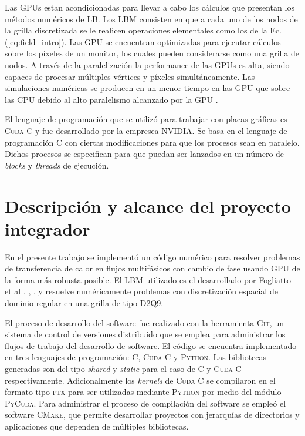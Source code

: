 Las GPUs estan acondicionadas para llevar a cabo los cálculos que presentan los métodos numéricos de LB. Los LBM consisten en que a cada uno de los nodos de la grilla discretizada se le realicen operaciones elementales como los de la Ec. (\ref{eq:field_intro}). Las GPU se encuentran optimizadas para ejecutar cálculos sobre los píxeles de un monitor, los cuales pueden considerarse como una grilla de nodos. A través de la paralelización la performance de las GPUs es alta, siendo capaces de procesar múltiples vértices y píxeles simultáneamente. Las simulaciones numéricas se producen en un menor tiempo en las GPU que sobre las CPU debido al alto paralelismo alcanzado por la GPU \cite{rinaldi2011modelos}.


El lenguaje de programación que se utilizó para trabajar con placas gráficas es \textsc{Cuda C} y fue desarrollado por la empresea NVIDIA. Se basa en el lenguaje de programación \textsc{C} con ciertas modificaciones para que los procesos sean en paralelo. Dichos procesos se especifican para que puedan ser lanzados en un número de \textit{blocks} y \textit{threads} de ejecución.

\newpage

\section{Descripción y alcance del proyecto integrador}

En el presente trabajo se implementó un código numérico para resolver problemas de transferencia de calor en flujos multifásicos con cambio de fase usando GPU de la forma más robusta posible. El LBM utilizado es el desarrollado por Fogliatto et al \cite{fogliatto2018modelado}, \cite{fogliatto2019simulation}, \cite{fogliatto2019transferencia}, y resuelve numéricamente problemas con discretización espacial de dominio regular en una grilla de tipo D2Q9.

El proceso de desarrollo del software fue realizado con la herramienta \textsc{Git}, un sistema de control de versiones distribuido que se emplea para administrar los flujos de trabajo del desarrollo de software.  El código se encuentra implementado en tres lenguajes de programación: \textsc{C}, \textsc{Cuda C} y \textsc{Python}. Las bibliotecas generadas son del tipo \textit{shared} y \textit{static} para el caso de \textsc{C} y \textsc{Cuda C} respectivamente. Adicionalmente los \textit{kernels} de \textsc{Cuda C} se compilaron en el formato tipo \textsc{ptx} para ser utilizadas mediante \textsc{Python} por medio del módulo \textsc{PyCuda}. Para administrar el proceso de compilación del software se empleó el software \textsc{CMake}, que permite desarrollar proyectos con jerarquías de directorios y aplicaciones que dependen de múltiples bibliotecas.

